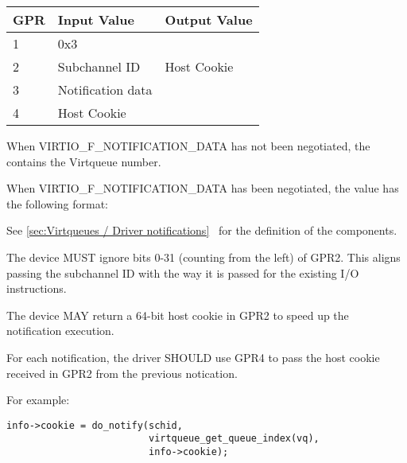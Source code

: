 \begin{tabular}{ |l|l|l| }
\hline
GPR  &   Input Value     & Output Value \\
\hline \hline
  1   &       0x3         &              \\
\hline
  2   &  Subchannel ID    & Host Cookie  \\
\hline
  3   & Notification data &              \\
\hline
  4   &   Host Cookie     &              \\
\hline
\end{tabular}

When VIRTIO_F_NOTIFICATION_DATA has not been negotiated,
the  contains the Virtqueue number.

When VIRTIO_F_NOTIFICATION_DATA has been negotiated,
the value has the following format:


See \ref{sec:Virtqueues / Driver notifications}~
for the definition of the components.

The device MUST ignore bits 0-31 (counting from the left) of GPR2.
This aligns passing the subchannel ID with the way it is passed
for the existing I/O instructions.

The device MAY return a 64-bit host cookie in GPR2 to speed up the
notification execution.


For each notification, the driver SHOULD use GPR4 to pass the host cookie received in GPR2 from the previous notication.

\begin{note}
For example:
\begin{lstlisting}
info->cookie = do_notify(schid,
                         virtqueue_get_queue_index(vq),
                         info->cookie);
\end{lstlisting}
\end{note}

